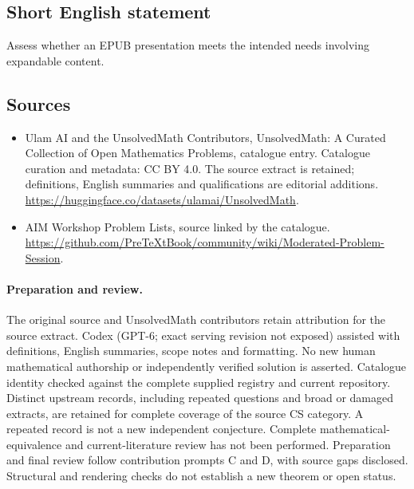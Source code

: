 \documentclass[11pt]{article}
\begin{document}
\subsection{Short English statement}
Assess whether an EPUB presentation meets the intended needs involving expandable content.
\subsection{Sources}
\begin{itemize}
\item[\hypertarget{source:statement:1}{S1}] Ulam AI and the UnsolvedMath Contributors, UnsolvedMath: A Curated Collection of Open Mathematics Problems, catalogue entry. Catalogue curation and metadata: CC BY 4.0. The source extract is retained; definitions, English summaries and qualifications are editorial additions.
\url{https://huggingface.co/datasets/ulamai/UnsolvedMath}.
\item[\hypertarget{source:statement:2}{S2}] AIM Workshop Problem Lists, source linked by the catalogue.
\url{https://github.com/PreTeXtBook/community/wiki/Moderated-Problem-Session}.
\end{itemize}
\paragraph{Preparation and review.}
The original source and UnsolvedMath contributors retain attribution for the source extract. Codex (GPT-6; exact serving revision not exposed) assisted with definitions, English summaries, scope notes and formatting. No new human mathematical authorship or independently verified solution is asserted. Catalogue identity checked against the complete supplied registry and current repository. Distinct upstream records, including repeated questions and broad or damaged extracts, are retained for complete coverage of the source CS category. A repeated record is not a new independent conjecture. Complete mathematical-equivalence and current-literature review has not been performed. Preparation and final review follow contribution prompts C and D, with source gaps disclosed. Structural and rendering checks do not establish a new theorem or open status.
\label{end:statement}
\end{document}
